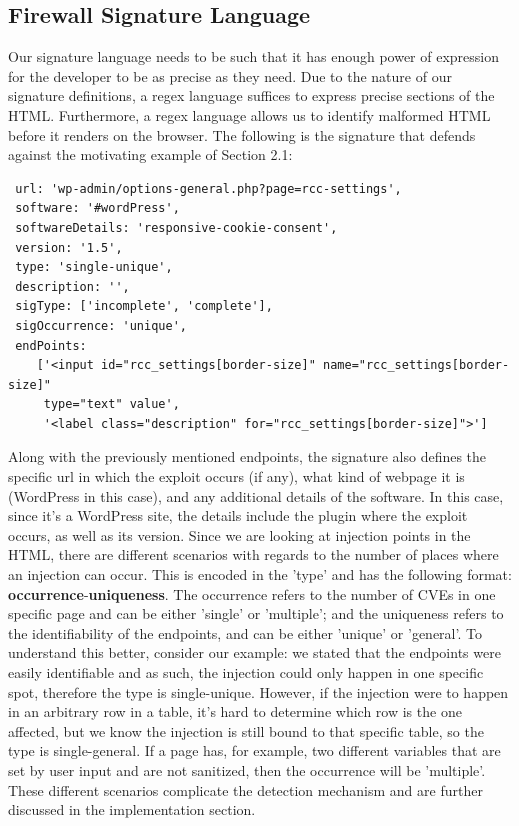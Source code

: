  \subsection{Firewall Signature Language}
 Our signature language needs to be such that it has enough power of expression for the developer to be as precise as they need. Due to the nature of our signature definitions, a regex language suffices to express precise sections of the HTML. Furthermore, a regex language allows us to identify malformed HTML before it renders on the browser. The following is the signature that defends against the motivating example of Section 2.1:
 \lstset{basicstyle=\tiny}
 \begin{lstlisting}
 url: 'wp-admin/options-general.php?page=rcc-settings',
 software: '#wordPress',
 softwareDetails: 'responsive-cookie-consent',
 version: '1.5',
 type: 'single-unique',
 description: '',
 sigType: ['incomplete', 'complete'],
 sigOccurrence: 'unique',
 endPoints: 
 	['<input id="rcc_settings[border-size]" name="rcc_settings[border-size]" 
 	 type="text" value',
  	 '<label class="description" for="rcc_settings[border-size]">']
 \end{lstlisting}
 
 Along with the previously mentioned endpoints, the signature also defines the specific url in which the exploit occurs (if any), what kind of webpage it is (WordPress in this case), and any additional details of the software. In this case, since it's a WordPress site, the details include the plugin where the exploit occurs, as well as its version. Since we are looking at injection points in the HTML, there are different scenarios with regards to the number of places where an injection can occur. This is encoded in the 'type' and has the following format: \textbf{occurrence}-\textbf{uniqueness}. The occurrence refers to the number of CVEs in one specific page and can be either 'single' or 'multiple'; and the uniqueness refers to the identifiability of the endpoints, and can be either 'unique' or 'general'. To understand this better, consider our example: we stated that the endpoints were easily identifiable and as such, the injection could only happen in one specific spot, therefore the type is single-unique. However, if the injection were to happen in an arbitrary row in a table, it's hard to determine which row is the one affected, but we know the injection is still bound to that specific table, so the type is single-general. If a page has, for example, two different variables that are set by user input and are not sanitized, then the occurrence will be 'multiple'. These different scenarios complicate the detection mechanism and are further discussed in the implementation section.
 
